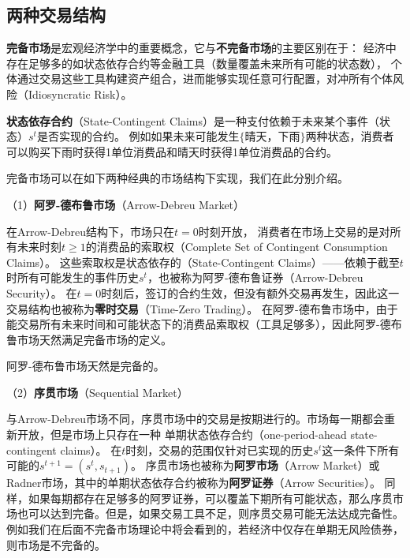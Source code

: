 \subsection{两种交易结构}

\textbf{完备市场}是宏观经济学中的重要概念，它与\textbf{不完备市场}的主要区别在于：
经济中存在足够多的如状态依存合约等金融工具（数量覆盖未来所有可能的状态数），
个体通过交易这些工具构建资产组合，进而能够实现任意可行配置，对冲所有个体风险（Idiosyncratic Risk）。
\begin{definition}
    \textbf{状态依存合约}（State-Contingent Claims）是一种支付依赖于未来某个事件（状态）$s^t$是否实现的合约。
    例如如果未来可能发生$\{\text{晴天，下雨}\}$两种状态，消费者可以购买下雨时获得1单位消费品和晴天时获得1单位消费品的合约。
\end{definition}

完备市场可以在如下两种经典的市场结构下实现，我们在此分别介绍。

（1）\textbf{阿罗-德布鲁市场}（Arrow-Debreu Market） 

在Arrow-Debreu结构下，市场只在$t=0$时刻开放，
消费者在市场上交易的是对所有未来时刻$t\geq 1$的消费品的索取权（Complete Set of Contingent Consumption Claims）。
这些索取权是状态依存的（State-Contingent Claims）——依赖于截至$t$时所有可能发生的事件历史$s^t$，也被称为阿罗-德布鲁证券（Arrow-Debreu Security）。
在$t=0$时刻后，签订的合约生效，但没有额外交易再发生，因此这一交易结构也被称为\textbf{零时交易}（Time-Zero Trading）。
在阿罗-德布鲁市场中，由于能交易所有未来时间和可能状态下的消费品索取权（工具足够多），因此阿罗-德布鲁市场天然满足完备市场的定义。
\begin{property}
    阿罗-德布鲁市场天然是完备的。
\end{property}

（2）\textbf{序贯市场}（Sequential Market）

与Arrow-Debreu市场不同，序贯市场中的交易是按期进行的。市场每一期都会重新开放，但是市场上只存在一种
单期状态依存合约（one-period-ahead state-contingent claims）。
在$t$时刻，交易的范围仅针对已实现的历史$s^t$这一条件下所有可能的$s^{t+1}=\left(s^t,s_{t+1}\right)$。
序贯市场也被称为\textbf{阿罗市场}（Arrow Market）或Radner市场，其中的单期状态依存合约被称为\textbf{阿罗证券}（Arrow Securities）。
同样，如果每期都存在足够多的阿罗证券，可以覆盖下期所有可能状态，那么序贯市场也可以达到完备。但是，如果交易工具不足，则序贯交易可能无法达成完备性。
例如我们在后面不完备市场理论中将会看到的，若经济中仅存在单期无风险债券，则市场是不完备的。

